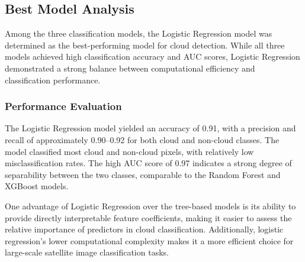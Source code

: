 \documentclass[11pt,letterpaper]{article}
\begin{document}




\vspace{1em} %
\subsection{Best Model Analysis}
\vspace{0.5em} %

Among the three classification models, the Logistic Regression model was determined as the best-performing model for cloud detection. While all three models achieved high classification accuracy and AUC scores, Logistic Regression demonstrated a strong balance between computational efficiency and classification performance.

\vspace{1em} %
\subsubsection{Performance Evaluation}
\vspace{0.5em} %

The Logistic Regression model yielded an accuracy of 0.91, with a precision and recall of approximately 0.90–0.92 for both cloud and non-cloud classes. The model classified most cloud and non-cloud pixels, with relatively low misclassification rates. The high AUC score of 0.97 indicates a strong degree of separability between the two classes, comparable to the Random Forest and XGBoost models.

One advantage of Logistic Regression over the tree-based models is its ability to provide directly interpretable feature coefficients, making it easier to assess the relative importance of predictors in cloud classification. Additionally, logistic regression's lower computational complexity makes it a more efficient choice for large-scale satellite image classification tasks.
\end{document}
